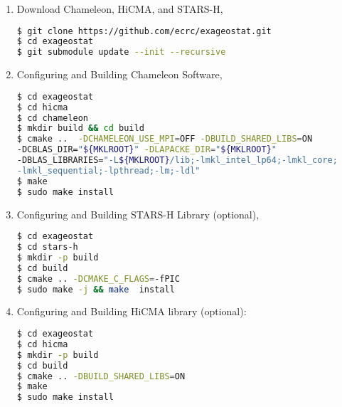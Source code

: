 \documentclass[
10pt, %
a4paper, %
oneside, %
headinclude,footinclude, %
BCOR5mm, %
]{scrartcl}
\begin{document}
\begin{enumerate}
%


\item
\noindent Download Chameleon, HiCMA, and STARS-H,
\begin{lstlisting}[language=bash]
$ git clone https://github.com/ecrc/exageostat.git
$ cd exageostat
$ git submodule update --init --recursive
\end{lstlisting}

\item
\noindent Configuring and Building Chameleon Software,
\begin{lstlisting}[language=bash]
$ cd exageostat
$ cd hicma
$ cd chameleon
$ mkdir build && cd build
$ cmake ..  -DCHAMELEON_USE_MPI=OFF -DBUILD_SHARED_LIBS=ON 
-DCBLAS_DIR="${MKLROOT}" -DLAPACKE_DIR="${MKLROOT}"
-DBLAS_LIBRARIES="-L${MKLROOT}/lib;-lmkl_intel_lp64;-lmkl_core; 
-lmkl_sequential;-lpthread;-lm;-ldl"
$ make 
$ sudo make install
\end{lstlisting}


\item
\noindent Configuring and Building STARS-H Library (optional),
\begin{lstlisting}[language=bash]
$ cd exageostat
$ cd stars-h
$ mkdir -p build
$ cd build 
$ cmake .. -DCMAKE_C_FLAGS=-fPIC 
$ sudo make -j && make  install
\end{lstlisting}



\item
\noindent Configuring and Building HiCMA library (optional):
\begin{lstlisting}[language=bash]
$ cd exageostat
$ cd hicma
$ mkdir -p build
$ cd build
$ cmake .. -DBUILD_SHARED_LIBS=ON
$ make 
$ sudo make install
\end{lstlisting}
\end{enumerate}
\end{document}
